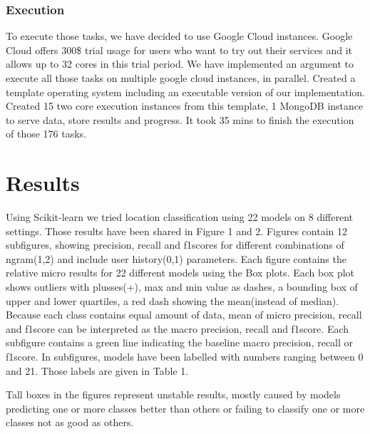 \documentclass[twoside,11pt]{article}
\begin{document}
\subsubsection{Execution}
To execute those tasks, we have decided to use Google Cloud instances. Google Cloud offers 300\$ trial usage for users who want to try out their services and it allows up to 32 cores in this trial period. We have implemented an argument to execute all those tasks on multiple google cloud instances, in parallel. Created a template operating system including an executable version of our implementation. Created 15 two core execution instances from this template, 1 MongoDB instance to serve data, store results and progress. It took 35 mins to finish the execution of those 176 tasks. 


\section{Results}
Using Scikit-learn\cite{scikit-learn} we tried location classification using 22 models on 8 different settings. Those results have been shared in Figure 1 and 2. Figures contain 12 subfigures, showing precision, recall and f1scores for different combinations of ngram(1,2) and include user history(0,1) parameters. Each figure contains the relative micro results for 22 different models using the Box plots\cite{mcgill1978variations}. Each box plot shows outliers with plusses(+), max and min value as dashes, a bounding box of upper and lower quartiles, a red dash showing the mean(instead of median). Because each class contains equal amount of data, mean of micro precision, recall and f1score can be interpreted as the macro precision, recall and f1score. Each subfigure contains a green line indicating the baseline macro precision, recall or f1score. In subfigures, models have been labelled with numbers ranging between 0 and 21. Those labels are given in Table 1. 

Tall boxes in the figures represent unstable results, mostly caused by models predicting one or more classes better than others or failing to classify one or more classes not as good as others.
\end{document}
